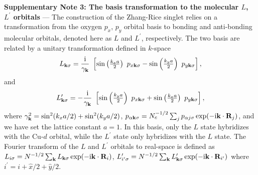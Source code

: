 \documentclass[11pt,superscriptaddress,floatfix,notitlepage]{revtex4-1}
\begin{document}
\newpage\noindent\textbf{Supplementary Note 3: The basis transformation to the molecular $L$, $L^\prime$ orbitals} --- The construction of the Zhang-Rice singlet relies on a transformation from the oxygen $p_x$, $p_y$ orbital basis to bonding and anti-bonding molecular orbitals, denoted here 
as $L$ and $L^\prime$, respectively. The two basis are related by a unitary transformation \cite{ZhangRice,Avella2013,Maier4} defined in $k$-space  
\begin{equation}
L_{{\bf k}\sigma}=\frac{\text{i}}{\gamma_{{\bf k}}}~\left[\sin\left(\tfrac{k_xa}{2}\right)~p_{x{\bf k}\sigma}- \sin\left(\tfrac{k_ya}{2}\right)~p_{y{\bf k}\sigma}\right],\label{Lk}
\end{equation}
and
\begin{equation}
L^\prime_{{\bf k}\sigma}=-\frac{\text{i}}{\gamma_{{\bf k}}}~\left[\sin\left(\tfrac{k_ya}{2}\right)~p_{x{\bf k}\sigma}+ \sin\left(\tfrac{k_xa}{2}\right)~p_{y{\bf k}\sigma}\right],\label{Lbark}
\end{equation}
where $\gamma^2_{{\bf k}}=\sin^2(k_xa/2)+\sin^2(k_ya/2)$,  $p_{\alpha{\bf k}\sigma}=N^{-1/2}_c\sum_{j} p_{\alpha j \sigma}\exp(-\text{i}{\bf k} \cdot {\bf R}_j)$, and we have set the lattice constant $a = 1$. In this basis, only the $L$ state hybridizes with the Cu-$d$ orbital, while the $L^\prime$ state only hybridizes with the $L$ state. The Fourier transform of the $L$ and $L^\prime$ orbitals to real-space is defined as $L_{i\sigma}=N^{-1/2} \sum_{\bf k}L_{{\bf k}\sigma} \exp(-\text{i}{\bf k} \cdot {\bf R}_i)$, $L^\prime_{i^\prime\sigma}=N^{-1/2} \sum_{\bf k}L^\prime_{{\bf k}\sigma} \exp(-\text{i}{\bf k} \cdot {\bf R}_{i^\prime})$ where $i^\prime=i+\hat{x}/2+\hat{y}/2$.
\newline
\end{document}
